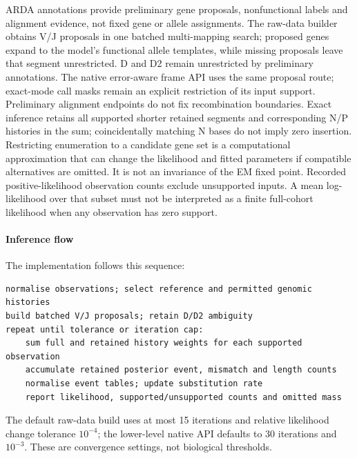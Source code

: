 \documentclass[11pt]{article}
\theoremstyle{oldplain}
\theoremstyle{oldrem}
\begin{document}
ARDA annotations provide preliminary gene proposals, nonfunctional labels and
alignment evidence, not fixed gene or allele assignments.
The raw-data builder obtains V/J proposals in one batched multi-mapping search;
proposed genes expand to the model's functional allele templates, while missing
proposals leave that segment unrestricted. D and D2 remain unrestricted by
preliminary annotations. The native error-aware frame API uses the same proposal
route; exact-mode call masks remain an explicit restriction of its input support.
Preliminary alignment endpoints do not fix recombination boundaries. Exact inference retains all supported
shorter retained segments and corresponding N/P histories in the sum;
coincidentally matching N bases do not imply zero insertion. Restricting enumeration
to a candidate gene set is a computational approximation that can change the
likelihood and fitted parameters if compatible alternatives are omitted. It is not
an invariance of the EM fixed point. Recorded positive-likelihood observation counts
exclude unsupported inputs. A mean log-likelihood over that subset must not be
interpreted as a finite full-cohort likelihood when any observation has zero support.

\paragraph{Inference flow} The implementation follows this sequence:
\begin{Verbatim}[fontsize=\small]
normalise observations; select reference and permitted genomic histories
build batched V/J proposals; retain D/D2 ambiguity
repeat until tolerance or iteration cap:
    sum full and retained history weights for each supported observation
    accumulate retained posterior event, mismatch and length counts
    normalise event tables; update substitution rate
    report likelihood, supported/unsupported counts and omitted mass
\end{Verbatim}
The default raw-data build uses at most 15 iterations and relative likelihood
change tolerance $10^{-4}$; the lower-level native API defaults to 30 iterations
and $10^{-3}$. These are convergence settings, not biological thresholds.
\end{document}
